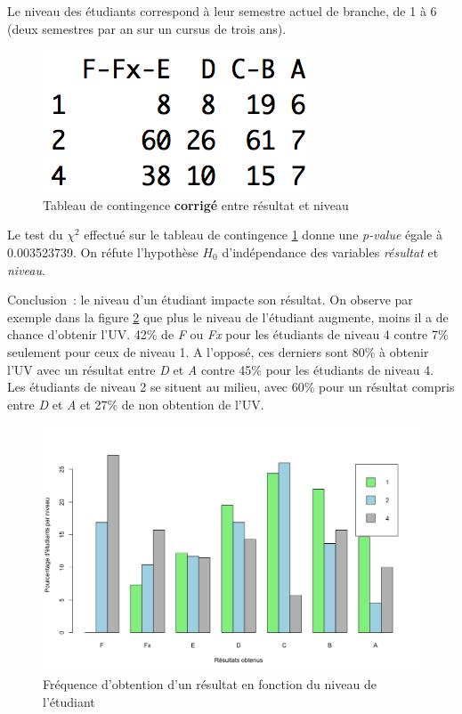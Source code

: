 \documentclass[a4paper,10pt]{report}
\begin{document}
Le niveau des étudiants correspond à leur semestre actuel de branche, de 1 à 6 (deux semestres par an sur un cursus de trois ans).

\begin{figure}[H]
	\centering
	\captionsetup{justification=centering, margin=1cm}
	\includegraphics[width=0.2\linewidth]{img/1-1-2-Contingence-Result-Niveau-Corrige}
	\caption{\scriptsize Tableau de contingence \textbf{corrigé} entre résultat et niveau}
	\label{fig:tab_contingence_diplome_niveau_corrige}
\end{figure}

Le test du $\chi^2$ effectué sur le tableau de contingence \ref{fig:tab_contingence_diplome_niveau_corrige} donne une \textit{p-value} égale à 0.003523739. On réfute l'hypothèse $H_{0}$ d'indépendance des variables \textit{résultat} et \textit{niveau}.

Conclusion~: le niveau d'un étudiant impacte son résultat. On observe par exemple dans la figure \ref{fig:frequence_resultats_niveau} que plus le niveau de l'étudiant augmente, moins il a de chance d'obtenir l'UV. 42\% de \textit{F} ou \textit{Fx} pour les étudiants de niveau 4 contre 7\% seulement pour ceux de niveau 1. A l'opposé, ces derniers sont 80\% à obtenir l'UV avec un résultat entre \textit{D} et \textit{A} contre 45\% pour les étudiants de niveau 4. Les étudiants de niveau 2 se situent au milieu, avec 60\% pour un résultat compris entre \textit{D} et \textit{A} et 27\% de non obtention de l'UV.

\begin{figure}[H]
	\centering
	\captionsetup{justification=centering, margin=2cm}
	\includegraphics[width=.5\linewidth]{img/1-1-2-Ratio-resultat-niveau}
	\caption{\scriptsize Fréquence d'obtention d'un résultat en fonction du niveau de l'étudiant}
	\label{fig:frequence_resultats_niveau}
\end{figure}
\end{document}
